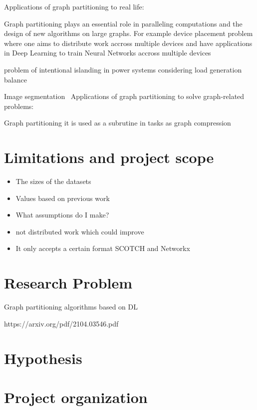 Applications of graph partitioning to real life:

Graph partitioning plays an essential role in paralleling computations and the design of new algorithms on large graphs. For example device placement problem where one aims to distribute work accross multiple devices and have applications in Deep Learning to train Neural Networks accross multiple devices \cite{deviceplacement} 

problem of intentional islanding in power systems considering load generation balance ~ \cite{islanding}

Image segmentation~\cite{imagesegmentation}
Applications of graph partitioning to solve graph-related problems:

Graph partitioning it is used as a subrutine in tasks as graph compression ~ \cite{compressgraphs}
\section{Limitations and project scope}
\begin{itemize}
    \item The sizes of the datasets
    \item Values based on previous work
    \item What assumptions do I make?
    \item not distributed work which could improve
    \item It only accepts a certain format SCOTCH and Networkx
\end{itemize}

\section{Research Problem}
Graph partitioning algorithms based on DL

https://arxiv.org/pdf/2104.03546.pdf
\section{Hypothesis}

\section{Project organization}

